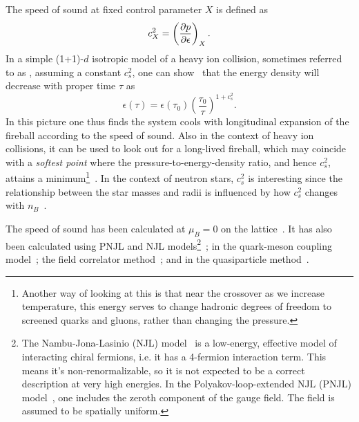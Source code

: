 The speed of sound at fixed control parameter $X$ is defined as
\begin{equation}
  c_X^2=\left(\pdv{p}{\epsilon}\right)_X.
\end{equation}
In a simple (1+1)-$d$ isotropic model of a heavy ion collision, 
sometimes referred to as , 
assuming a constant $c_s^2$, one can show~\cite{bjorken_highly_1983} 
that the energy density will decrease with proper time $\tau$ as
\begin{equation}
  \epsilon(\tau)=\epsilon(\tau_0)\left(\frac{\tau_0}{\tau}\right)^{1+c_s^2}.
\end{equation}
In this picture one thus finds the system cools with longitudinal expansion
of the fireball according to the speed of sound. %
Also in the context of heavy ion collisions, it can be used to look out
for a long-lived fireball, which may coincide with a {\it softest point}
 where the pressure-to-energy-density ratio,
and hence $c_s^2$, attains a minimum\footnote{Another way of looking at
this is that near the crossover as we increase temperature, this
energy serves to change hadronic degrees of freedom to screened
quarks and gluons, rather than changing the pressure.}~\cite{hung_hydrodynamics_1995}.
In the context of neutron stars, $c_s^2$ is interesting since the relationship
between the star masses and radii is influenced by how $c_s^2$ changes with
$n_B$~\cite{ozel_masses_2016}.

The speed of sound has been calculated at $\mu_B=0$ on the 
lattice~\cite{borsanyi_qcd_2010,bazavov_equation_2014,borsanyi_full_2014}.
It has also been calculated using PNJL and NJL 
models\footnote{The Nambu-Jona-Lasinio (NJL)
model~\cite{nambu_dynamical_1961,nambu_dynamical_1961-1} is a low-energy,
effective model of interacting chiral fermions, i.e. it has a 4-fermion
interaction term. This means it's non-renormalizable, so it is not expected
to be a correct description at very high energies.
In the Polyakov-loop-extended NJL (PNJL) model~\cite{meisinger_chiral_1996}, 
one includes the zeroth component of the gauge field. The field is assumed to
be spatially uniform.}~\cite{ghosh_susceptibilities_2006,marty_transport_2013,deb_estimating_2016,motta_isentropic_2020,zhao_thermodynamic_2020};
in the quark-meson coupling
model~\cite{schaefer_thermodynamics_2010,abhishek_transport_2018};
the field correlator
method~\cite{khaidukov_speed_2018,khaidukov_thermodynamics_2019};
and in the quasiparticle method~\cite{mykhaylova_impact_2021}.

